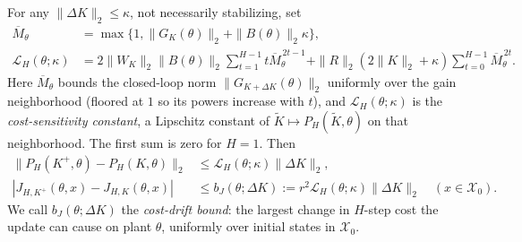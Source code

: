 \begin{lemma}
\label{lem:stage2_cost_sensitivity}
For any $\|\Delta K\|_2\le\kappa$, not necessarily stabilizing, set
\begin{align}
\label{eq:stage2_uniform_cost_constants}
 \overline M_\theta&=\max\{1,\|G_K(\theta)\|_2+\|B(\theta)\|_2\kappa\},\\
 \mathcal L_H(\theta;\kappa)
 &=2\|W_K\|_2\|B(\theta)\|_2
       \sum_{t=1}^{H-1}t\overline M_\theta^{\,2t-1}
   +\|R\|_2(2\|K\|_2+\kappa)
       \sum_{t=0}^{H-1}\overline M_\theta^{\,2t}.
\end{align}
Here $\overline M_\theta$ bounds the closed-loop norm
$\|G_{K+\Delta K}(\theta)\|_2$ uniformly over the gain neighborhood
(floored at $1$ so its powers increase with $t$), and
$\mathcal L_H(\theta;\kappa)$ is the \emph{cost-sensitivity constant}, a
Lipschitz constant of $\widetilde K\mapsto P_H(\widetilde K,\theta)$ on that
neighborhood. The first sum is zero for $H=1$. Then
\begin{align}
\label{eq:stage2_cost_matrix_drift}
 \|P_H(K^+,\theta)-P_H(K,\theta)\|_2
 &\le\mathcal L_H(\theta;\kappa)\|\Delta K\|_2,\\
\label{eq:stage2_cost_drift}
 |J_{H,K^+}(\theta,x)-J_{H,K}(\theta,x)|
 &\le b_J(\theta;\Delta K)
 :=r^2\mathcal L_H(\theta;\kappa)\|\Delta K\|_2
 \quad(x\in\mathcal X_0).
\end{align}
We call $b_J(\theta;\Delta K)$ the \emph{cost-drift bound}: the largest
change in $H$-step cost the update can cause on plant $\theta$, uniformly
over initial states in $\mathcal X_0$.
\end{lemma}

